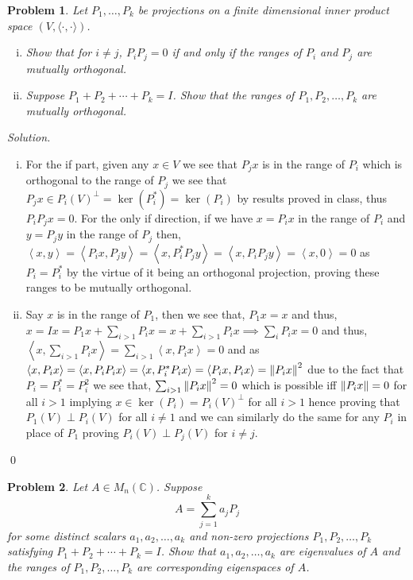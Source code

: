 \documentclass[12pt,a4paper]{article}
\newenvironment{solution}{%
  \par\noindent\textit{Solution.}\ }{\qed}
\theoremstyle{problemstyle}
\newtheorem{problem}{Problem}[section]
\newcommand{\ipp}[1]{\left\langle#1\right\rangle}
\begin{document}
\begin{problem}\label{prob:4-7}
Let $P_1, \ldots, P_k$ be projections on a finite dimensional inner product space $(V, \langle \cdot, \cdot \rangle)$.
\begin{enumerate}[(i)]
    \item Show that for $i \neq j$, $P_i P_j = 0$ if and only if the ranges of $P_i$ and $P_j$ are mutually orthogonal.
    \item Suppose $P_1 + P_2 + \cdots + P_k = I$. Show that the ranges of $P_1, P_2, \ldots, P_k$ are mutually orthogonal.
\end{enumerate}
\end{problem}
\begin{solution}
	\begin{enumerate}[(i)]
		\item For the if part, given any $x\in V$ we see that $P_jx$ is in the range of $P_i$ which is orthogonal to the range of $P_j$ we see that $P_jx\in P_i(V)^\perp=\ker(P_i^*)=\ker(P_i)$ by results proved in class, thus $P_iP_jx=0$.  
		For the only if direction, if we have $x=P_ix$ in the range of $P_i$ and $y=P_jy$ in the range of $P_j$ then, $\ipp{x,y}=\ipp{P_ix,P_jy}=\ipp{x,P_i^*P_jy}=\ipp{x,P_iP_jy}=\ipp{x,0}=0$ as $P_i=P_i^*$ by the virtue of it being an orthogonal projection, proving these ranges to be mutually orthogonal. 
	\item Say $x$ is in the range of $P_1$, then we see that, $P_1x=x$ and thus, $x=Ix=P_1x+\sum_{i>1}P_ix=x+\sum_{i>1}P_ix\implies\sum_iP_ix=0$ and thus, $\ipp{x,\sum_{i>1}P_ix}=\sum_{i>1}\ipp{x,P_ix}=0$ and as $\ipp{x,P_ix}=\ipp{x,P_iP_ix}=\ipp{x,P_i^*P_ix}=\ipp{P_ix,P_ix}=\norm{P_ix}^2$ due to the fact that $P_i=P_i^*=P_i^2$ we see that, $\sum_{i>1}\norm{P_ix}^2=0$ which is possible iff $\norm{P_ix}=0$ for all $i>1$ implying $x\in\ker(P_i)=P_i(V)^\perp$ for all $i>1$ hence proving that $P_1(V)\perp P_i(V)$ for all $i\neq 1$ and we can similarly do the same for any $P_i$ in place of $P_1$ proving $P_i(V)\perp P_j(V)$ for $i\neq j$. 
	\end{enumerate}
\end{solution}
\begin{problem}\label{prob:4-8}
Let $A \in M_n(\mathbb{C})$. Suppose
\[
A = \sum_{j=1}^{k} a_j P_j
\]
for some distinct scalars $a_1, a_2, \ldots, a_k$ and non-zero projections $P_1, P_2, \ldots, P_k$ satisfying $P_1 + P_2 + \cdots + P_k = I$. Show that $a_1, a_2, \ldots, a_k$ are eigenvalues of $A$ and the ranges of $P_1, P_2, \ldots, P_k$ are corresponding eigenspaces of $A$.
\end{problem}
\end{document}

